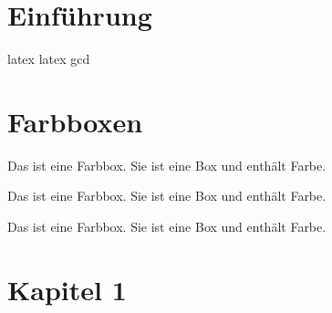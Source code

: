 \documentclass[../main.tex]{subfiles}
\begin{document}

\section{Einführung}
\cite{sansom1958history}
\gls{latex}
\Gls{latex}
\acrshort{gcd}
\lipsum[1-2]

\newpage
\section{Farbboxen}
\begin{tcolorbox}[colback=orange!5!white,colframe=orange!75!black,title=\textbf{Farbboxe Orange}]
Das ist eine Farbbox. Sie ist eine Box und enthält Farbe.
\end{tcolorbox}

\begin{tcolorbox}[colback=red!5!white,colframe=red!75!black,title=\textbf{Farbboxe Rot}]
Das ist eine Farbbox. Sie ist eine Box und enthält Farbe.
\end{tcolorbox}

\begin{tcolorbox}[colback=blue!5!white,colframe=blue!75!black,title=\textbf{Farbboxe Blau}]
Das ist eine Farbbox. Sie ist eine Box und enthält Farbe.
\end{tcolorbox}

\newpage
\section{Kapitel 1}
\end{document}
